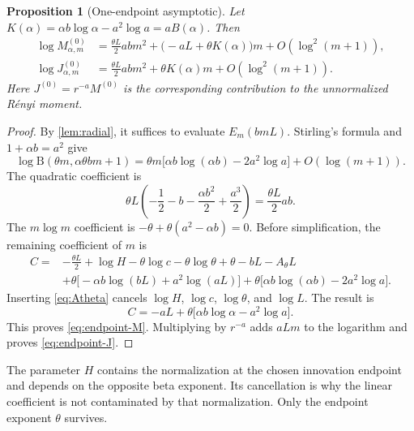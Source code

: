 \documentclass[11pt,a4paper]{article}
\numberwithin{equation}{section}
\newtheorem{proposition}[proposition]{Proposition}
\theoremstyle{definition}\newaliascnt{definition}{theorem}
\theoremstyle{remark}\newaliascnt{remark}{theorem}
\newcommand{\Bf}{\mathrm B}
\begin{document}
\begin{proposition}[One-endpoint asymptotic]
\label{prop:endpoint-asymptotic}
Let $K(\alpha)=\alpha b\log\alpha-a^2\log a=aB(\alpha)$. Then
\begin{align}
 \log M_{\alpha,m}^{(0)}
  & =\frac{\theta L}{2}abm^2
       +\bigl(-aL+\theta K(\alpha)\bigr)m
       +O(\log^2(m+1)),\label{eq:endpoint-M}\\
 \log J_{\alpha,m}^{(0)}
  & =\frac{\theta L}{2}abm^2
       +\theta K(\alpha)m+O(\log^2(m+1)).
 \label{eq:endpoint-J}
\end{align}
Here $J^{(0)}=r^{-a}M^{(0)}$ is the corresponding contribution to the
unnormalized R\'enyi moment.
\end{proposition}
\begin{proof}
By \cref{lem:radial}, it suffices to evaluate $E_m(bmL)$. Stirling's formula
and $1+\alpha b=a^2$ give
\begin{equation}
 \log\Bf(\theta m,\alpha\theta bm+1)
 =\theta m\bigl[\alpha b\log(\alpha b)-2a^2\log a\bigr]
       +O(\log(m+1)).
 \label{eq:beta-stirling}
\end{equation}
The quadratic coefficient is
\[
 \theta L\left(-\frac12-b-\frac{\alpha b^2}{2}
                                    +\frac{a^3}{2}\right)
       =\frac{\theta L}{2}ab.
\]
The $m\log m$ coefficient is $-\theta+\theta(a^2-\alpha b)=0$.
Before simplification, the remaining coefficient of $m$ is
\begin{align}
 C={}&-\frac{\theta L}{2}+\log H-\theta\log c
          -\theta\log\theta+\theta-bL-A_\theta L\nonumber\\
    &+\theta\bigl[-\alpha b\log(bL)+a^2\log(aL)\bigr]
      +\theta\bigl[\alpha b\log(\alpha b)-2a^2\log a\bigr].
 \label{eq:raw-linear}
\end{align}
Inserting \eqref{eq:Atheta} cancels $\log H$, $\log c$, $\log\theta$, and
$\log L$. The result is
\begin{equation}
 C=-aL+\theta\bigl[\alpha b\log\alpha-a^2\log a\bigr].
 \label{eq:linear-cancelled}
\end{equation}
This proves \eqref{eq:endpoint-M}. Multiplying by $r^{-a}$ adds $aLm$ to the
logarithm and proves \eqref{eq:endpoint-J}.
\end{proof}
The parameter $H$ contains the normalization at the chosen innovation
endpoint and depends on the opposite beta exponent. Its cancellation is
why the linear coefficient is not contaminated by that normalization.
Only the endpoint exponent $\theta$ survives.
\end{document}
